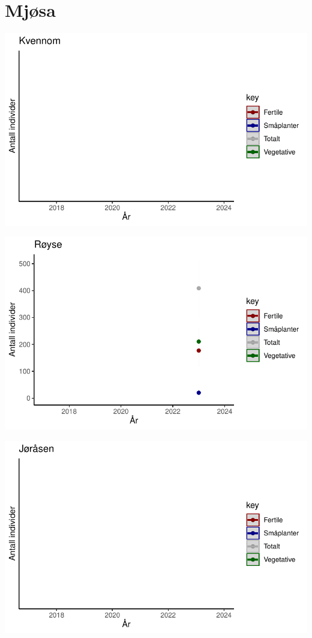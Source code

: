 \documentclass[
  letterpaper,
  DIV=11,
  numbers=noendperiod]{scrreport}
\begin{document}
\hypertarget{mjuxf8sa}{%
\section{Mjøsa}\label{mjuxf8sa}}

\includegraphics{localEst_files/figure-pdf/unnamed-chunk-6-1.pdf}

\includegraphics{localEst_files/figure-pdf/unnamed-chunk-6-2.pdf}

\includegraphics{localEst_files/figure-pdf/unnamed-chunk-6-3.pdf}
\end{document}
